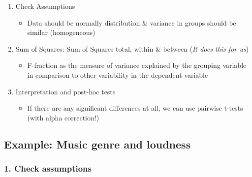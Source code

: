 \documentclass[
]{book}
\providecommand{\tightlist}{%
  \setlength{\itemsep}{0pt}\setlength{\parskip}{0pt}}
\begin{document}
\begin{enumerate}
\def\labelenumi{\arabic{enumi}.}
\tightlist
\item
  Check Assumptions

  \begin{itemize}
  \tightlist
  \item
    Data should be normally distribution \& variance in groups should be similar (homogeneous)
  \end{itemize}
\item
  Sum of Squares: Sum of Squares total, within \& between (\emph{R does this for us})

  \begin{itemize}
  \tightlist
  \item
    F-fraction as the measure of variance explained by the grouping variable in comparison to other variability in the dependent variable
  \end{itemize}
\item
  Interpretation and post-hoc tests

  \begin{itemize}
  \tightlist
  \item
    If there are any significant differences at all, we can use pairwise t-tests (with alpha correction!)
  \end{itemize}
\end{enumerate}

\subsection{\texorpdfstring{Example: Music genre and loudness }{Example: Music genre and loudness }}\label{example-music-genre-and-loudness}

\subsubsection{1. Check assumptions}\label{check-assumptions}
\end{document}
